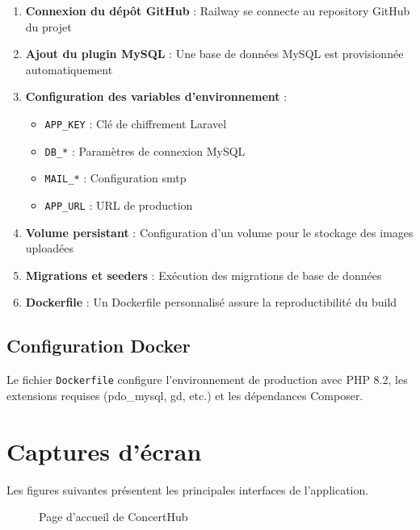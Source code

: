 \documentclass[a4paper,12pt,twoside]{report}
\begin{document}
\begin{enumerate}
    \item \textbf{Connexion du dépôt GitHub} : Railway se connecte au repository GitHub du projet
    
    \item \textbf{Ajout du plugin MySQL} : Une base de données MySQL est provisionnée automatiquement
    
    \item \textbf{Configuration des variables d'environnement} :
    \begin{itemize}
        \item \texttt{APP\_KEY} : Clé de chiffrement Laravel
        \item \texttt{DB\_*} : Paramètres de connexion MySQL
        \item \texttt{MAIL\_*} : Configuration \gls{smtp}
        \item \texttt{APP\_URL} : URL de production
    \end{itemize}
    
    \item \textbf{Volume persistant} : Configuration d'un volume pour le stockage des images uploadées
    
    \item \textbf{Migrations et seeders} : Exécution des migrations de base de données
    
    \item \textbf{Dockerfile} : Un Dockerfile personnalisé assure la reproductibilité du build
\end{enumerate}

\subsection{Configuration Docker}

Le fichier \texttt{Dockerfile} configure l'environnement de production avec PHP 8.2, les extensions requises (pdo\_mysql, gd, etc.) et les dépendances Composer.

\section{Captures d'écran}

Les figures suivantes présentent les principales interfaces de l'application.

\begin{figure}[!h]
    \centering
    \caption{Page d'accueil de ConcertHub}
    \label{fig:home}
\end{figure}
\end{document}
